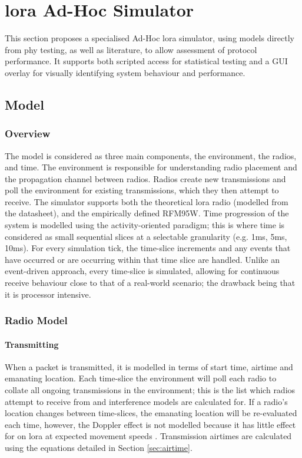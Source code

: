 \chapter{\ac{lora} Ad-Hoc Simulator}
This section proposes a specialised Ad-Hoc \ac{lora} simulator, using models directly from \ac{phy} testing, as well as literature, to allow assessment of protocol performance. It supports both scripted access for statistical testing and a GUI overlay for visually identifying system behaviour and performance. 

\section{Model}
\subsection{Overview}
The model is considered as three main components, the environment, the radios, and time. The environment is responsible for understanding radio placement and the propagation channel between radios. Radios create new transmissions and poll the environment for existing transmissions, which they then attempt to receive. The simulator supports both the theoretical \ac{lora} radio (modelled from the datasheet), and the empirically defined RFM95W. Time progression of the system is modelled using the activity-oriented paradigm; this is where time is considered as small sequential slices at a selectable granularity (e.g. 1ms, 5ms, 10ms). For every simulation tick, the time-slice increments and any events that have occurred or are occurring within that time slice are handled. Unlike an event-driven approach, every time-slice is simulated, allowing for continuous receive behaviour close to that of a real-world scenario; the drawback being that it is processor intensive.


\subsection{Radio Model}
\subsubsection{Transmitting}
When a packet is transmitted, it is modelled in terms of start time, airtime and emanating location. Each time-slice the environment will poll each radio to collate all ongoing transmissions in the environment; this is the list which radios attempt to receive from and interference models are calculated for. If a radio's location changes between time-slices, the emanating location will be re-evaluated each time, however, the Doppler effect is not modelled because it has little effect for  on \ac{lora} at expected movement speeds \cite{3YP:DOPLER_EFFECT}. Transmission airtimes are calculated using the equations detailed in Section \ref{sec:airtime}.

